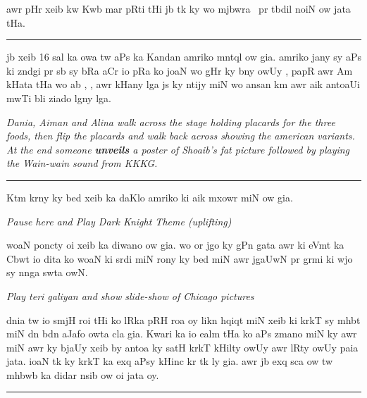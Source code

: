 \documentclass{article}
\begin{document}
	awr pHr xeib kw Kwb mar pRti tHi jb tk ky wo mjbwra~  pr tbdil noiN ow jata tHa.

\rule{\textwidth}{1pt}

	jb xeib 16 sal ka owa tw aPs ka Kandan amriko mntql ow gia.
	amriko jany sy aPs ki zndgi pr sb sy bRa aCr io pRa ko joaN wo gHr ky bny owUy , papR awr Am kHata tHa wo ab , , awr  kHany lga js ky ntijy miN wo ansan km awr aik antoaUi mwTi bli ziado lgny lga.

\begin{enpara}
	\itshape
	Dania, Aiman and Alina walk across the stage holding placards for the three foods, then flip the placards and walk back across showing the american variants. At the end someone \textbf{unveils} a poster of Shoaib's fat picture followed by playing the Wain-wain sound from KKKG.
\end{enpara}

\rule{\textwidth}{1pt}

	 Ktm krny ky bed xeib ka daKlo amriko ki aik mxowr  miN ow gia.
\begin{enpara}
	\itshape
	Pause here and Play Dark Knight Theme (uplifting)
\end{enpara}

	\vspace{0.5\baselineskip}
	woaN poncty oi xeib  ka diwano ow gia.
	wo or jgo  ky gPn gata awr  ki eVmt ka Cbwt io dita ko woaN ki srdi miN rony ky bed miN awr jgaUwN pr grmi ki wjo sy nnga swta owN. \hfill {}

\begin{enpara}
	\itshape
	Play teri galiyan and show slide-show of Chicago pictures
\end{enpara}

	\vspace{0.5\baselineskip}
	dnia tw io smjH roi tHi ko lRka  pRH roa oy likn hqiqt miN xeib ki krkT sy mhbt miN dn bdn aJafo owta cla gia.
	Kwari ka io ealm tHa ko aPs zmano miN  ky  awr  miN  awr  ky bjaUy xeib by antoa  ky satH krkT kHilty owUy awr lRty owUy paia jata.
	ioaN tk ky krkT ka exq aPsy kHinc kr  tk ly gia.
	awr jb exq sca ow tw mhbwb ka didar nsib ow oi jata oy. \hfill {}

\rule{\textwidth}{1pt}
\end{document}
